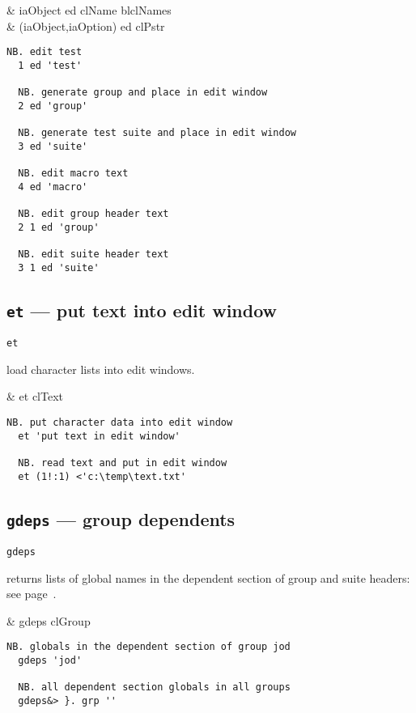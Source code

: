 \begin{wordhead}
\dyad & iaObject ed clName \argsep blclNames \\
      & (iaObject,iaOption) ed clPstr \\
\end{wordhead}
\begin{lstlisting}[frame=single,framerule=0pt]      
  NB. edit test
  1 ed 'test'
  
  NB. generate group and place in edit window    
  2 ed 'group'  
   
  NB. generate test suite and place in edit window
  3 ed 'suite'  
  
  NB. edit macro text 
  4 ed 'macro'  
   
  NB. edit group header text
  2 1 ed 'group' 
  
  NB. edit suite header text
  3 1 ed 'suite'  
\end{lstlisting}

\subsection{\texttt{et} --- put text into edit window}\label{ss:et} 

\hypertarget{il:et}{\texttt{et}} load character lists into edit windows.

\begin{wordhead}
\monad & et clText \\
\end{wordhead}
\begin{lstlisting}[frame=single,framerule=0pt]
  NB. put character data into edit window
  et 'put text in edit window' 

  NB. read text and put in edit window
  et (1!:1) <'c:\temp\text.txt' 
\end{lstlisting}

\subsection{\texttt{gdeps} --- group dependents}\label{ss:gdeps}

\hypertarget{il:gdeps}{\texttt{gdeps}} returns lists of global names 
in the dependent section of group and suite headers: see page~\pageref{ss:depsec}.

\begin{wordhead}
\monad & gdeps clGroup \\
\end{wordhead}
\begin{lstlisting}[frame=single,framerule=0pt]
  NB. globals in the dependent section of group jod
  gdeps 'jod'  
  
  NB. all dependent section globals in all groups
  gdeps&> }. grp ''
\end{lstlisting}

